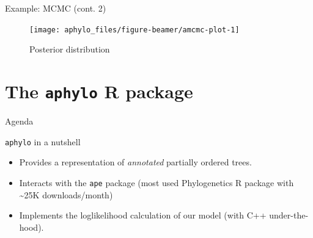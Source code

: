 \documentclass[9pt,ignorenonframetext,aspectratio=169]{beamer}
\begin{document}
\begin{frame}[t]{Example: MCMC (cont. 2)}

\footnotesize

\begin{figure}

{\centering \texttt{[image: aphylo\_files/figure-beamer/amcmc-plot-1]} 

}

\caption{Posterior distribution}\label{fig:amcmc-plot}
\end{figure}

\normalsize

\end{frame}

\section{\texorpdfstring{The \texttt{aphylo} R
package}{The aphylo R package}}\label{the-aphylo-r-package}

\begin{frame}[t]{Agenda}

\tableofcontents[currentsection]

\end{frame}

\begin{frame}[fragile]{\texttt{aphylo} in a nutshell}

\begin{itemize}
\item
  Provides a representation of \emph{annotated} partially ordered trees.
  \pause
\item
  Interacts with the \texttt{ape} package (most used Phylogenetics R
  package with \textasciitilde{}25K downloads/month) \pause
\item
  Implements the loglikelihood calculation of our model (with C++
  under-the-hood).
\end{itemize}

\end{frame}
\end{document}
